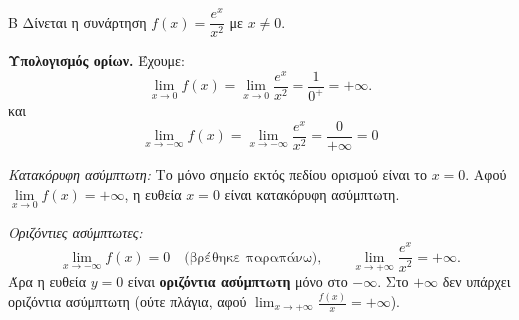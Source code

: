 \begin{thema}{Β}
Δίνεται η συνάρτηση $f(x) = \dfrac{e^x}{x^2}$ με $x \ne 0$.

\begin{erwthma}

\item \textbf{Υπολογισμός ορίων.}
Έχουμε:
\[
\lim\limits_{x\to 0}{f(x)}=\lim_{x \to 0} \frac{e^x}{x^2} = \frac{1}{0^+} = +\infty.
\]
και
\[
\lim\limits_{x\to -\infty}{f(x)}=\lim_{x \to -\infty} \frac{e^x}{x^2} = \frac{0}{+\infty}=0
\]

\textit{Κατακόρυφη ασύμπτωτη:} Το μόνο σημείο εκτός πεδίου ορισμού είναι το $x = 0$.
Αφού $\lim\limits_{x \to 0} f(x) = +\infty$, η ευθεία $x = 0$ είναι κατακόρυφη ασύμπτωτη.

\textit{Οριζόντιες ασύμπτωτες:}
\[
\lim_{x \to -\infty} f(x) = 0 \quad \text{(βρέθηκε παραπάνω)}, \qquad \lim_{x \to +\infty} \frac{e^x}{x^2} = +\infty.
\]
Άρα η ευθεία $y = 0$ είναι \textbf{οριζόντια ασύμπτωτη} μόνο στο $-\infty$. Στο $+\infty$ δεν υπάρχει οριζόντια ασύμπτωτη (ούτε πλάγια, αφού $\lim_{x\to+\infty}\frac{f(x)}{x}=+\infty$).


\end{erwthma}
\end{thema}
